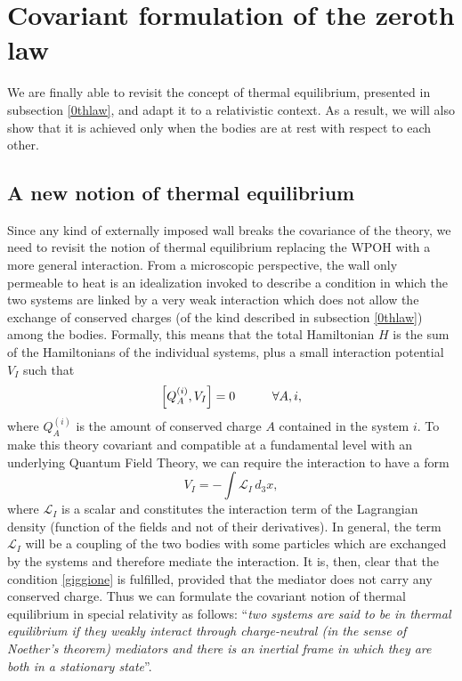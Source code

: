 \documentclass[twocolumn,usenatbib]{mnras2}
\newcommand{\spc}{\quad \quad \quad}
\begin{document}
\section{Covariant formulation of the zeroth law}

We are finally able to revisit the concept of thermal equilibrium, presented in subsection \ref{0thlaw}, and adapt it to a relativistic context. As a result, we will also show that it is achieved only when the bodies are at rest with respect to each other.

\subsection{A new notion of thermal equilibrium}\label{nofhermalequilibrium}

Since any kind of externally imposed wall breaks the covariance of the theory, we need to revisit the notion of thermal equilibrium replacing the WPOH with a more general interaction. From a microscopic perspective, the wall only permeable to heat is an idealization invoked to describe a condition in which the two systems are linked by a very weak interaction which does not allow the exchange of conserved charges (of the kind described in subsection \ref{0thlaw}) among the bodies. Formally, this means that the total Hamiltonian $H$ is the sum of the Hamiltonians of the individual systems, plus a small interaction potential $V_I$ such that
\begin{equation}\label{giggione}
\comm{Q_A^{(i)}}{V_I} =0 \spc \forall A,i,
\end{equation}
where $Q_A^{(i)}$ is the amount of conserved charge $A$ contained in the system $i$. To make this theory covariant and compatible at a fundamental level with an underlying Quantum Field Theory, we can require the interaction to have a form
\begin{equation}\label{interazione}
V_I = -\int \mathcal{L}_I \, d_3 x,
\end{equation} 
where $\mathcal{L}_I$ is a scalar and constitutes the interaction term of the Lagrangian density (function of the fields and not of their derivatives). In general, the term $\mathcal{L}_I$ will be a coupling of the two bodies with some particles which are exchanged by the systems and therefore mediate the interaction. It is, then, clear that the condition \eqref{giggione} is fulfilled, provided that the mediator does not carry any conserved charge. Thus we can formulate the covariant notion of thermal equilibrium in special relativity as follows: ``\textit{two systems are said to be in thermal equilibrium if they weakly interact through charge-neutral (in the sense of Noether's theorem) mediators and there is an inertial frame in which they are both in a stationary state}''.
\end{document}
